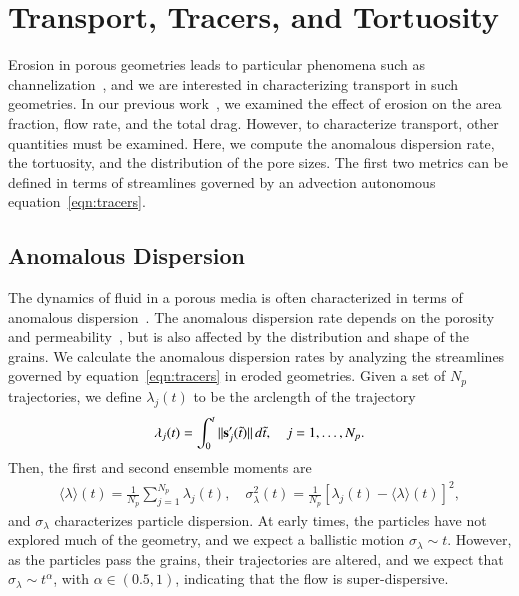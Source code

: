 \documentclass[preprint,10pt]{elsarticle}
\begin{document}
\section{Transport, Tracers, and Tortuosity}
\label{sec:transport}
Erosion in porous geometries leads to particular phenomena such as
channelization~\cite{berhanu2012shape}, and we are interested in
characterizing transport in such geometries.  In our previous
work~\cite{qua-moo2018}, we examined the effect of erosion on the area
fraction, flow rate, and the total drag.  However, to characterize
transport, other quantities must be examined.  Here, we compute the
anomalous dispersion rate, the tortuosity, and the distribution of the
pore sizes.  The first two metrics can be defined in terms of
streamlines governed by an advection autonomous
equation~\eqref{eqn:tracers}.

\subsection{Anomalous Dispersion}
\label{sec:dispersion}
The dynamics of fluid in a porous media is often characterized in terms
of anomalous dispersion~\cite{kla-rad-sok2008, den-cor-sch-ber2004}.
The anomalous dispersion rate depends on the porosity and
permeability~\cite{koc-bra1988}, but is also affected by the
distribution and shape of the grains. We calculate the anomalous
dispersion rates by analyzing the streamlines governed by
equation~\eqref{eqn:tracers} in eroded geometries. Given a set of $N_p$
trajectories, we define $\lambda_j(t)$ to be the arclength of the
trajectory
\begin{align}
  \lambda_j(t) = \int_{0}^t \|\ss'_j(\tilde{t})\|\, d\tilde{t}, 
    \quad j=1,\ldots,N_p.
\end{align}
Then, the first and second ensemble moments are
\begin{align}
  \label{eqn:moments}
  \langle \lambda \rangle (t) = 
    \frac{1}{N_p} \sum_{j=1}^{N_p} \lambda_j(t), \quad 
    \sigma_\lambda^2(t) = \frac{1}{N_p} 
    \left[\lambda_j(t) - \langle \lambda \rangle(t) \right]^2,
\end{align}
and $\sigma_\lambda$ characterizes particle dispersion.  At early times,
the particles have not explored much of the geometry, and we expect a
ballistic motion $\sigma_\lambda \sim t$.  However, as the particles
pass the grains, their trajectories are altered, and we expect that
$\sigma_\lambda \sim t^\alpha$, with $\alpha \in (0.5,1)$, indicating
that the flow is super-dispersive.
\end{document}
